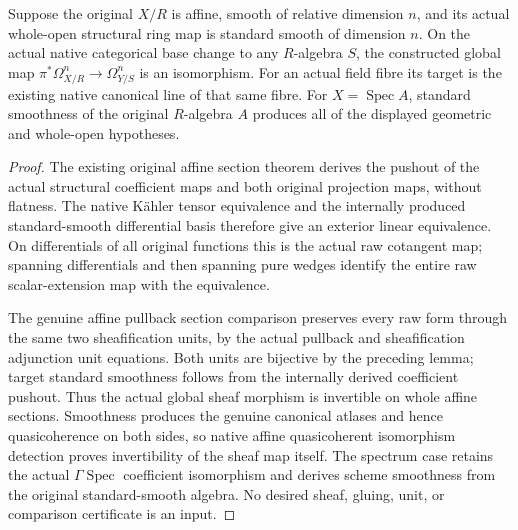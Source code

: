 \begin{lemma}
\label{lem:kn-arithmetic-global-affine-basechange-iso}
\leanok
{}
Suppose the original $X/R$ is affine, smooth of relative dimension $n$, and
its actual whole-open structural ring map is standard smooth of dimension
$n$.  On the actual native categorical base change to any $R$-algebra $S$,
the constructed global map
$\pi^*\Omega^n_{X/R}\to\Omega^n_{Y/S}$ is an isomorphism.  For an actual field
fibre its target is the existing native canonical line of that same fibre.
For $X=\operatorname{Spec} A$, standard smoothness of the original $R$-algebra
$A$ produces all of the displayed geometric and whole-open hypotheses.
\end{lemma}
\begin{proof}
The existing original affine section theorem derives the pushout of the
actual structural coefficient maps and both original projection maps,
without flatness.  The native K\"ahler tensor equivalence and the internally
produced standard-smooth differential basis therefore give an exterior
linear equivalence.  On differentials of all original functions this is
the actual raw cotangent map; spanning differentials and then spanning pure
wedges identify the entire raw scalar-extension map with the equivalence.

The genuine affine pullback section comparison preserves every raw form
through the same two sheafification units, by the actual pullback and
sheafification adjunction unit equations.  Both units are bijective by the
preceding lemma; target standard smoothness follows from the internally
derived coefficient pushout.  Thus the actual global sheaf morphism is
invertible on whole affine sections.  Smoothness produces the genuine
canonical atlases and hence quasicoherence on both sides, so native affine
quasicoherent isomorphism detection proves invertibility of the sheaf map
itself.  The spectrum case retains the actual $\Gamma\operatorname{Spec}$
coefficient isomorphism and derives scheme smoothness from the original
standard-smooth algebra.  No desired sheaf, gluing, unit, or comparison
certificate is an input.
\end{proof}

